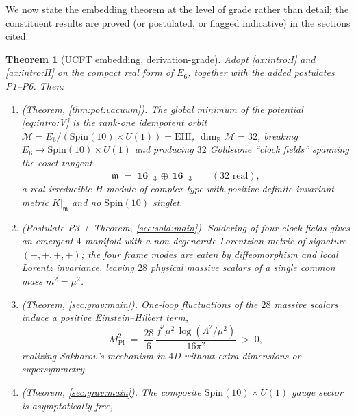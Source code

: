 \documentclass[11pt]{article}
\theoremstyle{plain}
\newtheorem{theorem}{Theorem}[section]
\theoremstyle{definition}
\theoremstyle{remark}
\begin{document}
We now state the embedding theorem at the level of grade rather than detail; the
constituent results are proved (or postulated, or flagged indicative) in the
sections cited.

\begin{theorem}[UCFT embedding, derivation-grade]\label{thm:intro:embedding}
\label{thm:foundations:qft}
Adopt \autoref{ax:intro:I} and \autoref{ax:intro:II} on the compact real form of
$E_6$, together with the added postulates \textnormal{P1--P6}. Then:
\begin{enumerate}[label=\textup{(\roman*)}]
  \item \textnormal{(Theorem, \autoref{thm:pot:vacuum}).} The global minimum of
    the potential \eqref{eq:intro:V} is the rank-one idempotent orbit
    $\mathcal{M}=E_6/(\mathrm{Spin}(10)\times U(1))=\mathrm{EIII}$,
    $\dim_{\mathbb{R}}\mathcal{M}=32$, breaking $E_6\to\mathrm{Spin}(10)\times U(1)$
    and producing $32$ Goldstone ``clock fields'' spanning the coset tangent
    \begin{equation}
      \mathfrak{m}\;=\;\mathbf{16}_{-3}\,\oplus\,\overline{\mathbf{16}}_{+3}
      \qquad (32\text{ real}),
      \label{eq:intro:coset}
    \end{equation}
    a real-irreducible $H$-module of complex type with positive-definite
    invariant metric $K|_{\mathfrak{m}}$ and no $\mathrm{Spin}(10)$ singlet.
  \item \textnormal{(Postulate P3 + Theorem, \autoref{sec:sold:main}).} Soldering
    of four clock fields gives an emergent $4$-manifold with a non-degenerate
    Lorentzian metric of signature $(-,+,+,+)$; the four frame modes are eaten
    by diffeomorphism and local Lorentz invariance, leaving $28$ physical
    massive scalars of a single common mass $m^{2}=\mu^{2}$.
  \item \textnormal{(Theorem, \autoref{sec:grav:main}).} One-loop fluctuations of
    the $28$ massive scalars induce a positive Einstein--Hilbert term,
    \begin{equation}
      M_{\mathrm{Pl}}^{2}\;=\;\frac{28}{6}\,
      \frac{f^{2}\mu^{2}\,\log(\Lambda^{2}/\mu^{2})}{16\pi^{2}}\;>\;0,
      \label{eq:intro:MPl}
    \end{equation}
    realizing Sakharov's mechanism in $4$D without extra dimensions or
    supersymmetry.
  \item \textnormal{(Theorem, \autoref{sec:grav:main}).} The composite
    $\mathrm{Spin}(10)\times U(1)$ gauge sector is asymptotically free,
    \begin{equation}

\end{equation}
\end{enumerate}
\end{theorem}
\end{document}

